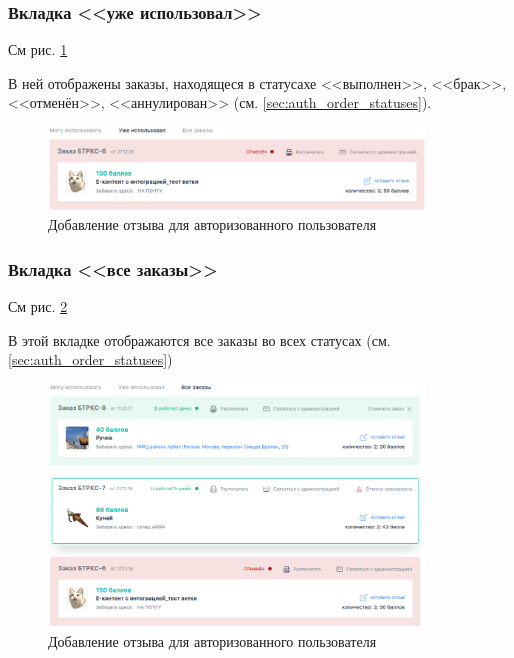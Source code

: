             \subsubsection{Вкладка <<уже использовал>>}
            См рис. \ref{fig:auth_orders_already_use}

            В ней отображены заказы, находящеся в статусахе
            <<выполнен>>, <<брак>>, <<отменён>>, <<аннулирован>> (см.
            \ref{sec:auth_order_statuses}).

            \begin{figure}
                \center
                \includegraphics[width=100mm]{04_auth_funcs/figures/09.eps}
                \caption{Добавление отзыва для авторизованного пользователя}
                \label{fig:auth_orders_already_use}
            \end{figure}

            \subsubsection{Вкладка <<все заказы>>}
            См рис. \ref{fig:auth_orders_all_use}

            В этой вкладке отображаются все заказы во всех статусах
            (см. \ref{sec:auth_order_statuses})
            \begin{figure}
                \center
                \includegraphics[width=100mm]{04_auth_funcs/figures/10.eps}
                \caption{Добавление отзыва для авторизованного пользователя}
                \label{fig:auth_orders_all_use}
            \end{figure}

